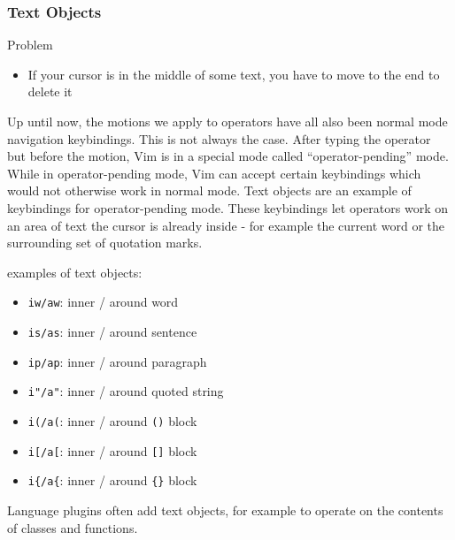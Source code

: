 \documentclass{beamer}
\begin{document}
\begin{frame}[fragile]
    \frametitle{Text Objects}
    \begin{block}{Problem}
	\begin{itemize}
	    \item If your cursor is in the middle of some text, you have to move to the end to delete it
	\end{itemize}
    \end{block}
    Up until now, the motions we apply to operators have all also been normal mode navigation keybindings. This is not always the case. After typing the operator but before the motion, Vim is in a special mode called \enquote{operator-pending} mode. While in operator-pending mode, Vim can accept certain keybindings which would not otherwise work in normal mode. Text objects are an example of keybindings for operator-pending mode. These keybindings let operators work on an area of text the cursor is already inside - for example the current word or the surrounding set of quotation marks.
\end{frame}

\begin{frame}[fragile]
    examples of text objects:
    \begin{itemize}
	\item \verb+iw/aw+: inner / around word
	\item \verb+is/as+: inner / around sentence
	\item \verb+ip/ap+: inner / around paragraph
	\item \verb+i"/a"+: inner / around quoted string
	\item \verb+i(/a(+: inner / around \verb+()+ block
	\item \verb+i[/a[+: inner / around \verb+[]+ block
	\item \verb+i{/a{+: inner / around \verb+{}+ block
    \end{itemize}
    Language plugins often add text objects, for example to operate on the contents of classes and functions.
\end{frame}
\end{document}
